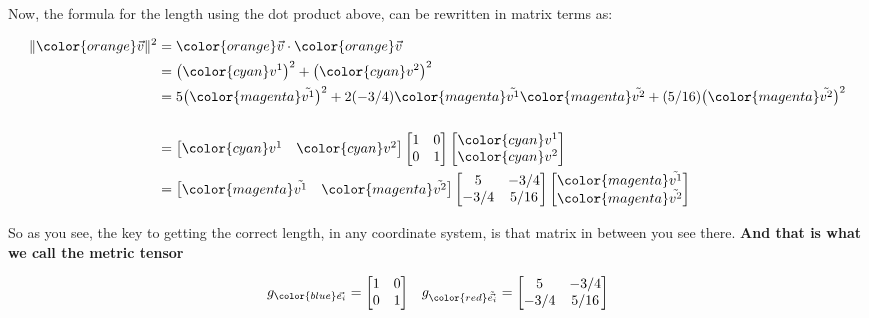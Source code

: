 Now, the formula for the length using the dot product above, can be rewritten in matrix terms as:

\begin{align*}
    \|\begingroup\color{orange}\vec{v}\endgroup\|^2 &= \begingroup\color{orange}\vec{v}\endgroup \cdot \begingroup\color{orange}\vec{v}\endgroup\\
    &= \bigl(\begingroup\color{cyan}v^1\endgroup\bigr)^2
    + \bigl(\begingroup\color{cyan}v^2\endgroup\bigr)^2\\ 
    &= 5 \bigl(\begingroup\color{magenta}\tilde{v^1}\endgroup\bigr)^2
    + 2(-3/4) \begingroup\color{magenta}\tilde{v^1}\endgroup\begingroup\color{magenta}\tilde{v^2}\endgroup
    + (5/16) \bigl(\begingroup\color{magenta}\tilde{v^2}\endgroup\bigr)^2\\ \\
    &= \begin{bmatrix}
        \begingroup\color{cyan}v^1\endgroup & \begingroup\color{cyan}v^2\endgroup
    \end{bmatrix} 
    \begin{bmatrix}
        1 & 0\\
        0 & 1
    \end{bmatrix} 
    \begin{bmatrix}
        \begingroup\color{cyan}v^1\endgroup\\
        \begingroup\color{cyan}v^2\endgroup 
    \end{bmatrix}\\
    &= \begin{bmatrix}
        \begingroup\color{magenta}\tilde{v^1}\endgroup & \begingroup\color{magenta}\tilde{v^2}\endgroup
    \end{bmatrix} 
    \begin{bmatrix}
        5 & -3/4\\
        -3/4 & 5/16
    \end{bmatrix} 
    \begin{bmatrix}
        \begingroup\color{magenta}\tilde{v^1}\endgroup\\
        \begingroup\color{magenta}\tilde{v^2}\endgroup 
    \end{bmatrix}
\end{align*}

So as you see, the key to getting the correct length, in any coordinate system, is that matrix in between you see there.
\textbf{And that is what we call the metric tensor}

\begin{align*}
    g_{\color{blue}\vec{e_i}} = \begin{bmatrix}
        1 & 0\\
        0 & 1
    \end{bmatrix} &&
    g_{\color{red}\tilde{\vec{e_i}}} = \begin{bmatrix}
        5 & -3/4\\
        -3/4 & 5/16
    \end{bmatrix}
\end{align*}

